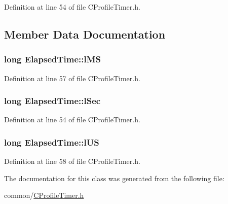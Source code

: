 \-Definition at line 54 of file \-C\-Profile\-Timer.\-h.



\subsection{\-Member \-Data \-Documentation}
\hypertarget{class_elapsed_time_a2b76a2dc61d0d0937e5d08e4b4866320}{
\subsubsection[{l\-M\-S}]{\setlength{\rightskip}{0pt plus 5cm}long {\bf \-Elapsed\-Time\-::l\-M\-S}}}\label{class_elapsed_time_a2b76a2dc61d0d0937e5d08e4b4866320}


\-Definition at line 57 of file \-C\-Profile\-Timer.\-h.

\hypertarget{class_elapsed_time_aedb8e2089f81dbec5475d4ac2f4f25dd}{
\subsubsection[{l\-Sec}]{\setlength{\rightskip}{0pt plus 5cm}long {\bf \-Elapsed\-Time\-::l\-Sec}}}\label{class_elapsed_time_aedb8e2089f81dbec5475d4ac2f4f25dd}


\-Definition at line 54 of file \-C\-Profile\-Timer.\-h.

\hypertarget{class_elapsed_time_a4160942c7eb69634b8e6fa5b32c7f047}{
\subsubsection[{l\-U\-S}]{\setlength{\rightskip}{0pt plus 5cm}long {\bf \-Elapsed\-Time\-::l\-U\-S}}}\label{class_elapsed_time_a4160942c7eb69634b8e6fa5b32c7f047}


\-Definition at line 58 of file \-C\-Profile\-Timer.\-h.



\-The documentation for this class was generated from the following file\-:\begin{DoxyCompactItemize}
\item 
common/\hyperlink{_c_profile_timer_8h}{\-C\-Profile\-Timer.\-h}\end{DoxyCompactItemize}
